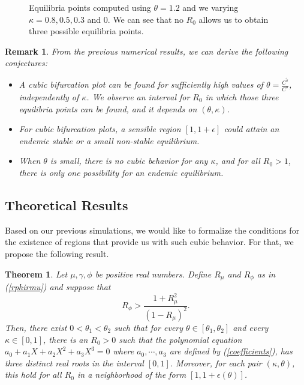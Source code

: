 \documentclass[sn-basic]{sn-jnl}%
\theoremstyle{thmstyleone}%
\newtheorem{theorem}{Theorem}%
\theoremstyle{thmstyletwo}%
\newtheorem{remark}{Remark}%
\theoremstyle{thmstylethree}%
\newcommand{\ws}{\widetilde{s}}
\begin{document}
\begin{figure}[H]
    \caption{Equilibria points computed using  $\theta = 1.2$ and we varying $\kappa = 0.8, 0.5, 0.3 $ and $0$. We can see that no $R_0$ allows us to obtain three possible equilibria points.}
    \label{fig_no_cubic}

\end{figure}

\begin{remark}
From the previous numerical results, we can derive the following conjectures:

\begin{itemize}
    \item[a)] A cubic bifurcation plot can be found for sufficiently high values of $\theta = \frac{C^{\ws}}{C^s}$, independently of $\kappa$. We observe an interval for $R_0$ in which those three equilibria points can be found, and it depends on $(\theta, \kappa)$.
    \item[b)] For cubic bifurcation plots, a sensible region $[1, 1+ \epsilon]$ could attain an endemic stable or a small non-stable equilibrium.
    \item[c)] When $\theta$ is small, there is no cubic behavior for any $\kappa$, and for all $R_0>1$, there is only one possibility for an endemic equilibrium.
\end{itemize}
\end{remark}

\subsection{Theoretical Results} 

Based on our previous simulations, we would like to formalize the conditions for the existence of regions that provide us with such cubic behavior. For that, we propose the following result.

\begin{theorem}\label{main_theorem}
Let $\mu,\gamma,\phi$ be positive real numbers. Define $R_\mu$ and $R_\phi$ as in (\ref{rphirmu}) and suppose that \begin{equation}\label{inequality}
    R_{\phi} > \frac{1+ R_\mu^2}{(1-R_\mu )^2}.
\end{equation} 
Then, there exist $0< \theta_1 <\theta_2$ such that for every $\theta \in [\theta_1,\theta_2]$ and every $\kappa \in [0,1]$, there is an $R_0>0$ such that the polynomial equation $a_0 + a_1 X + a_2 X^2 + a_3 X^3 = 0$ where $a_0, \cdots, a_3$ are defined by (\ref{coefficients}), has three distinct real roots in the  interval $[0,1]$. Moreover, for each pair $(\kappa, \theta)$, this hold for all $R_0$ in a neighborhood of the form $[1, 1+\epsilon({\theta})]$.
\end{theorem}
\end{document}

